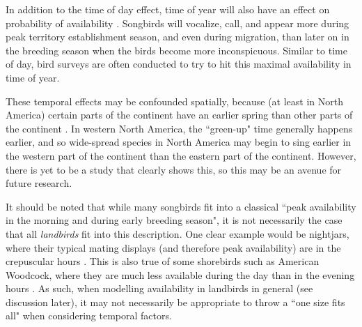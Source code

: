 \par In addition to the time of day effect, time of year will also have an effect on probability of availability \citep{wilson_reliability_1985, solymos_calibrating_2013}.
Songbirds will vocalize, call, and appear more during peak territory establishment season, and even during migration, than later on in the breeding season when the birds become more inconspicuous.
Similar to time of day, bird surveys are often conducted to try to hit this maximal availability in time of year.

\par These temporal effects may be confounded spatially, because (at least in North America) certain parts of the continent have an earlier spring than other parts of the continent \citep{solymos_evaluating_2018}.
In western North America, the ``green-up" time generally happens earlier, and so wide-spread species in North America may begin to sing earlier in the western part of the continent than the eastern part of the continent.
However, there is yet to be a study that clearly shows this, so this may be an avenue for future research.

\par It should be noted that while many songbirds fit into a classical ``peak availability in the morning and during early breeding season", it is not necessarily the case that all \textit{landbirds} fit into this description.
One clear example would be nightjars, where their typical mating displays (and therefore peak availability) are in the crepuscular hours \citep{knight_still_2022}.
This is also true of some shorebirds such as American Woodcock, where they are much less available during the day than in the evening hours \citep{binley_better_2023}.
As such, when modelling availability in landbirds in general (see discussion later), it may not necessarily be appropriate to throw a ``one size fits all" when considering temporal factors.

